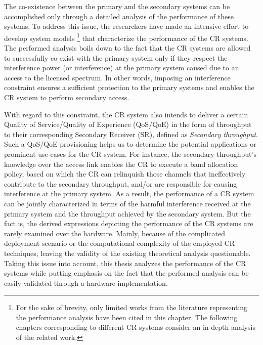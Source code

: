 The co-existence between the primary and the secondary systems can be accomplished only through a detailed analysis of the performance of these systems. %
To address this issue, the researchers have made an intensive effort to develop system models \cite{Liang08, Kang209, Kang09}\footnote{For the sake of brevity, only limited works from the literature representing the performance analysis have been cited in this chapter. The following chapters corresponding to different CR systems consider an in-depth analysis of the related work.} that characterize the performance of the CR systems. The performed analysis boils down to the fact that the CR systems are allowed to successfully co-exist with the primary system only if they respect the interference power (or interference) at the primary system caused due to an access to the licensed spectrum. In other words, imposing an interference constraint ensures a sufficient protection to the primary systems and enables the CR system to perform secondary access.
 

With regard to this constraint, the CR system also intends to deliver a certain Quality of Service/Quality of Experience (QoS/QoE) in the form of throughput to their corresponding Secondary Receiver (SR), defined as \textit{Secondary throughput}. Such a QoS/QoE provisioning helps us to determine the potential applications or prominent use-cases for the CR system. For instance, the secondary throughput's knowledge over the access link enables the CR to execute a band allocation policy, based on which the CR can relinquish those channels that ineffectively contribute to the secondary throughput, and/or are responsible for causing interference at the primary system. As a result, the performance of a CR system can be jointly characterized in terms of the harmful interference received at the primary system and the throughput achieved by the secondary system. 
But the fact is, the derived expressions depicting the performance of the CR systems are rarely examined over the hardware. Mainly, because of the complicated deployment scenario or the computational complexity of the employed CR techniques, leaving the validity of the existing theoretical analysis questionable. Taking this issue into account, this thesis analyzes the performance of the CR systems while putting emphasis on the fact that the performed analysis can be easily validated through a hardware implementation. 


